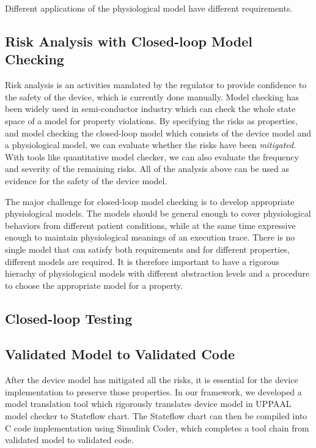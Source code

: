 \documentclass[a4paper]{article}
\begin{document}
Different applications of the physiological model have different requirements.

\subsection{Risk Analysis with Closed-loop Model Checking}
Risk analysis is an activities mandated by the regulator to provide confidence to the safety of the device, which is currently done manually.
Model checking has been widely used in semi-conductor industry which can check the whole state space of a model for property violations.
By specifying the risks as properties, and model checking the closed-loop model which consists of the device model and a physiological model, we can evaluate whether the risks have been \emph{mitigated}.
With tools like quantitative model checker, we can also evaluate the frequency and severity of the remaining risks.
All of the analysis above can be used as evidence for the safety of the device model.

The major challenge for closed-loop model checking is to develop appropriate physiological models. 
The models should be general enough to cover physiological behaviors from different patient conditions, while at the same time expressive enough to maintain physiological meanings of an execution trace.
There is no single model that can satisfy both requirements and for different properties, different models are required.
It is therefore important to have a rigorous hierachy of physiological models with different abstraction levels and a procedure to choose the appropriate model for a property.
\subsection{Closed-loop Testing}
\subsection{Validated Model to Validated Code}
After the device model has mitigated all the risks, it is essential for the device implementation to preserve those properties.
In our framework, we developed a model translation tool which rigorously translates device model in UPPAAL model checker to Stateflow chart.
The Stateflow chart can then be compiled into C code implementation using Simulink Coder, which completes a tool chain from validated model to validated code.
\end{document}
